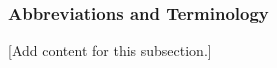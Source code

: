
\subsubsection{Abbreviations and Terminology}
\label{subsubsec:design_1_3_abbreviations_terminology}

[Add content for this subsection.]
